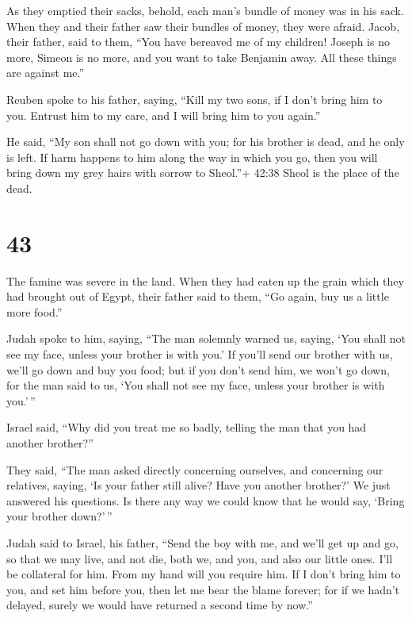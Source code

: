  As they emptied their sacks, behold, each man's bundle of
money was in his sack. When they and their father saw their bundles of
money, they were afraid.  Jacob, their father, said to
them, ``You have bereaved me of my children! Joseph is no more, Simeon
is no more, and you want to take Benjamin away. All these things are
against me.''

 Reuben spoke to his father, saying, ``Kill my two sons, if
I don't bring him to you. Entrust him to my care, and I will bring him
to you again.''

 He said, ``My son shall not go down with you; for his
brother is dead, and he only is left. If harm happens to him along the
way in which you go, then you will bring down my grey hairs with sorrow
to Sheol.''+ 42:38 Sheol is the place of the dead.

\hypertarget{section-42}{%
\section{43}\label{section-42}}

 The famine was severe in the land.  When they
had eaten up the grain which they had brought out of Egypt, their father
said to them, ``Go again, buy us a little more food.''

 Judah spoke to him, saying, ``The man solemnly warned us,
saying, `You shall not see my face, unless your brother is with you.'
 If you'll send our brother with us, we'll go down and buy
you food;  but if you don't send him, we won't go down, for
the man said to us, `You shall not see my face, unless your brother is
with you.'\,''

 Israel said, ``Why did you treat me so badly, telling the
man that you had another brother?''

 They said, ``The man asked directly concerning ourselves,
and concerning our relatives, saying, `Is your father still alive? Have
you another brother?' We just answered his questions. Is there any way
we could know that he would say, `Bring your brother down?'\,''

 Judah said to Israel, his father, ``Send the boy with me,
and we'll get up and go, so that we may live, and not die, both we, and
you, and also our little ones.  I'll be collateral for him.
From my hand will you require him. If I don't bring him to you, and set
him before you, then let me bear the blame forever;  for if
we hadn't delayed, surely we would have returned a second time by now.''

